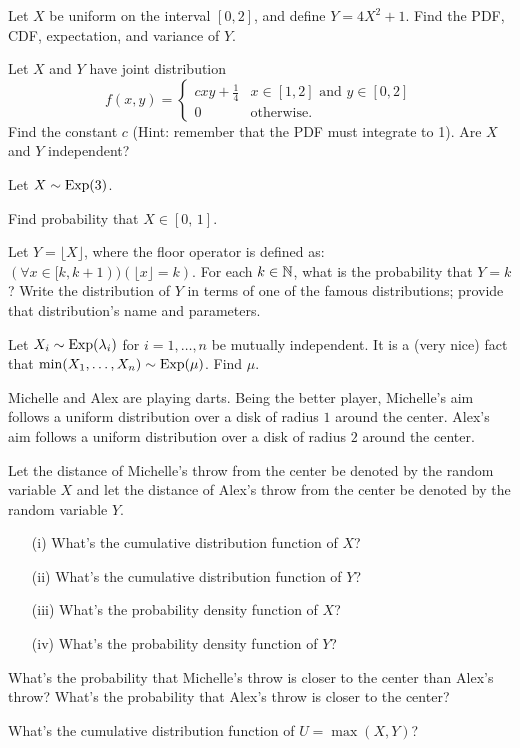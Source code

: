 \documentclass[11pt]{article}
\begin{document}
\begin{Parts}
    \Part Let $X$ be uniform on the interval $[0,2]$, and define $Y = 4X^2 + 1$. Find the PDF, CDF, expectation, and variance of $Y$.

    \Part Let $X$ and $Y$ have joint distribution 
    \[
        f(x,y) = \begin{cases}
            c x y + \frac{1}{4} & \text{$x \in [1,2]$ and $y \in [0,2]$} \\
            0 & \text{otherwise.}
        \end{cases}
    \]
    Find the constant $c$ (Hint: remember that the PDF must integrate to 1). Are $X$ and $Y$ independent?

    \Part Let $X \sim \operatorname{Exp}(3)$. 
    \begin{Parts}
    	\item Find probability that $X \in [0, \,1]$.
    	\item Let $Y = \lfloor X \rfloor$, where the floor operator is defined as:  $(\forall x \in [k, k+1))(\lfloor x \rfloor = k)$. For each $k \in \mathbb{N}$, what is the probability that $Y = k$? Write the distribution of $Y$ in terms of one of the famous distributions; provide that distribution's name and parameters.
    \end{Parts}

    \Part Let $X_i \sim \operatorname{Exp}(\lambda_i)$ for $i = 1,\ldots,n$ be mutually independent. It is a (very nice) fact that $\min(X_1,\ldots,X_n) \sim \operatorname{Exp}(\mu)$. Find $\mu$.
\end{Parts}


Michelle and Alex are playing darts.
Being the better player, Michelle's aim follows a uniform distribution over a disk of radius $1$ around the center. Alex's aim follows a uniform distribution over a disk of radius $2$ around the center. 

\begin{Parts}
    \Part Let the distance of Michelle's throw from the center be denoted by the random variable $X$ and let the distance of Alex's throw from the center be denoted by the random variable $Y$.
    \begin{enumerate}
    \item[(i)] What's the cumulative distribution function of $X$?
    \item[(ii)] What's the cumulative distribution function of $Y$?
    \item[(iii)] What's the probability density function of $X$?
    \item[(iv)] What's the probability density function of $Y$?
    \end{enumerate}
    
    \Part What's the probability that Michelle's throw is closer to the center than Alex's throw? What's the probability that Alex's throw is closer to the center? 
    
    \Part What's the cumulative distribution function of $U = \max(X,Y)$?

    
        
\end{Parts}
\end{document}
